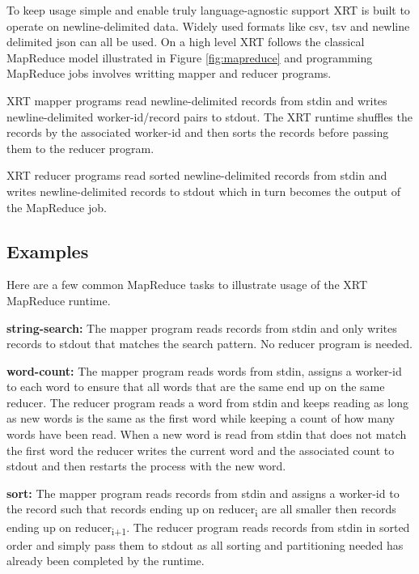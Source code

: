 \documentclass[twocolumn,11px]{article}       %
\begin{document}
To keep usage simple and enable truly language-agnostic support XRT is built to operate on newline-delimited data.
Widely used formats like csv, tsv and newline delimited json can all be used.
On a high level XRT follows the classical MapReduce model illustrated in Figure \ref{fig:mapreduce} and programming MapReduce jobs involves writting mapper and reducer programs.

XRT mapper programs read newline-delimited records from stdin and writes newline-delimited worker-id/record pairs to stdout.
The XRT runtime shuffles the records by the associated worker-id and then sorts the records before passing them to the reducer program.

XRT reducer programs read sorted newline-delimited records from stdin and writes newline-delimited records to stdout which in turn becomes the output of the MapReduce job.

\subsection{Examples} \label{sec:examples}

Here are a few common MapReduce tasks to illustrate usage of the XRT MapReduce runtime.

\bigskip
\noindent
\textbf{string-search:} The mapper program reads records from stdin and only writes records to stdout that matches the search pattern. No reducer program is needed.

\bigskip
\noindent
\textbf{word-count:} The mapper program reads words from stdin, assigns a worker-id to each word to ensure that all words that are the same end up on the same reducer.
The reducer program reads a word from stdin and keeps reading as long as new words is the same as the first word while keeping a count of how many words have been read.
When a new word is read from stdin that does not match the first word the reducer writes the current word and the associated count to stdout and then restarts the process with the new word.

\bigskip
\noindent
\textbf{sort:} The mapper program reads records from stdin and assigns a worker-id to the record such that records ending up on reducer\textsubscript{i} are all smaller then records ending up on reducer\textsubscript{i+1}.
The reducer program reads records from stdin in sorted order and simply pass them to stdout as all sorting and partitioning needed has already been completed by the runtime.
\end{document}
